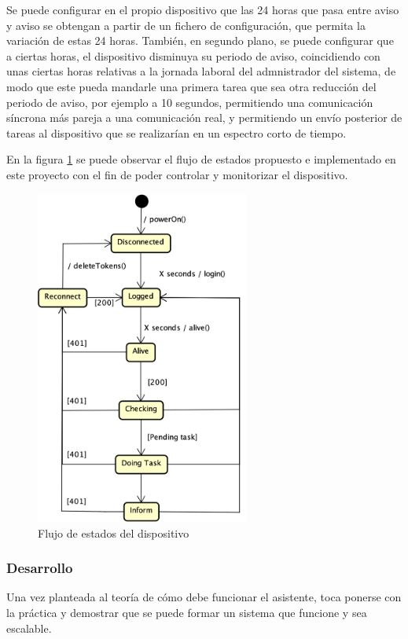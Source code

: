         Se puede configurar en el propio dispositivo que las 24 horas que pasa entre aviso y aviso se obtengan a partir de un fichero de configuración, que permita la variación de estas 24 horas.
        También, en segundo plano, se puede configurar que a ciertas horas, el dispositivo disminuya su periodo de aviso, coincidiendo con unas ciertas horas relativas a la jornada laboral del admnistrador del sistema, de modo que este pueda mandarle una primera tarea que sea otra reducción del periodo de aviso, por ejemplo a 10 segundos, permitiendo una comunicación síncrona más pareja a una comunicación real, y permitiendo un envío posterior de tareas al dispositivo que se realizarían en un espectro corto de tiempo.
        
        En la figura \ref{fig:prototype-flow} se puede observar el flujo de estados propuesto e implementado en este proyecto con el fin de poder controlar y monitorizar el dispositivo.
        
        \begin{figure}[h!]
            \centering
            \includegraphics[width=7cm]{./img/state/prototype-flow.png}
            \caption{Flujo de estados del dispositivo}
            \label{fig:prototype-flow}
        \end{figure}
    
    \subsubsection{Desarrollo}
        Una vez planteada al teoría de cómo debe funcionar el asistente, toca ponerse con la práctica y demostrar que se puede formar un sistema que funcione y sea escalable.
        

